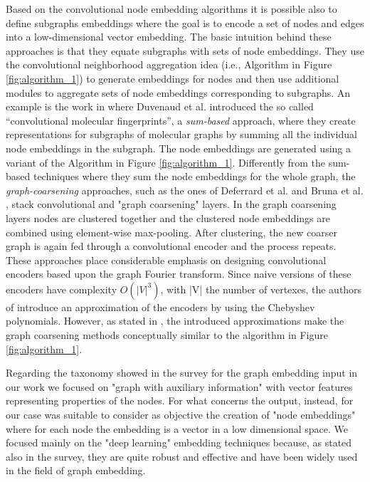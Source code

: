 Based on the convolutional node embedding algorithms it is possible also to define subgraphs embeddings where the goal is to encode a set of nodes and edges into a low-dimensional vector embedding. The basic intuition behind these approaches is that they equate subgraphs with sets of node embeddings. They use the convolutional neighborhood aggregation idea (i.e., Algorithm in Figure \ref{fig:algorithm_1}) to generate embeddings for nodes and then use additional modules to aggregate sets of
node embeddings corresponding to subgraphs. An example is the work in \cite{molecular_fingerprints} where Duvenaud et al. introduced the so called “convolutional molecular fingerprints”, a \textit{sum-based} approach, where they create representations for subgraphs of molecular graphs by summing all the individual node embeddings in the subgraph. The node embeddings are generated using a variant of the Algorithm in Figure \ref{fig:algorithm_1}. Differently from the sum-based techniques where they sum the node embeddings for the whole graph, the \textit{graph-coarsening} approaches, such as the ones of Deferrard et al. \cite{deferrard} and Bruna et al. \cite{spectral_networks_local_connected_networks}, stack convolutional and "graph coarsening" layers. In the graph coarsening layers nodes are clustered together and the clustered node embeddings are combined using element-wise max-pooling. After clustering, the new coarser graph is again fed through a convolutional encoder and the process repeats. These approaches place considerable emphasis on designing convolutional encoders based upon the graph Fourier transform. Since naive versions of these encoders have complexity \(O(|V|^3)\), with |V| the number of vertexes, the authors of \cite{deferrard} introduce an approximation of the encoders by using the Chebyshev polynomials. However, as stated in \cite{representationLearning}, the introduced approximations make the graph coarsening methods conceptually similar to the algorithm in Figure \ref{fig:algorithm_1}.


Regarding the taxonomy showed in the survey \cite{surveyGraphEmbedding} for the graph embedding input in our work we focused on "graph with auxiliary information" with vector features representing properties of the nodes. For what concerns the output, instead, for our case was suitable to consider as objective the creation of "node embeddings" where for each node the embedding is a vector in a low dimensional space. We focused mainly on the "deep learning" embedding techniques because, as stated also in the survey, they are quite robust and effective and have been widely used in the field of graph embedding.


